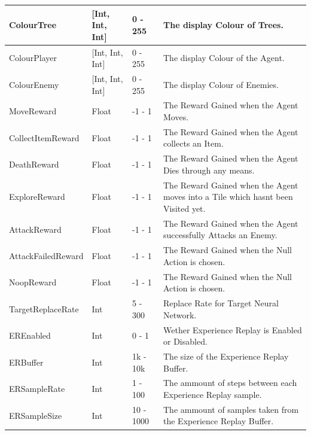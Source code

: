 \begin{flushleft}
\begin{longtable}{| C{4cm} | C{2cm} | C{1.5cm} | C{8cm} |}
                    \hline
                    ColourTree & [Int, Int, Int] & 0 - 255 & The display Colour of Trees. \\
                    \hline
                    ColourPlayer & [Int, Int, Int] & 0 - 255 & The display Colour of the Agent. \\
                    \hline
                    ColourEnemy & [Int, Int, Int] & 0 - 255 & The display Colour of Enemies. \\
                    \hline
                    MoveReward & Float & -1 - 1 & The Reward Gained when the Agent Moves. \\
                    \hline
                    CollectItemReward & Float & -1 - 1 & The Reward Gained when the Agent collects an Item. \\
                    \hline
                    DeathReward & Float & -1 - 1 & The Reward Gained when the Agent Dies through any means. \\
                    \hline
                    ExploreReward & Float & -1 - 1 & The Reward Gained when the Agent moves into a Tile which hasnt been Visited yet. \\
                    \hline
                    AttackReward & Float & -1 - 1 & The Reward Gained when the Agent successfully Attacks an Enemy. \\
                    \hline
                    AttackFailedReward & Float & -1 - 1 & The Reward Gained when the Null Action is chosen. \\
                    \hline
                    NoopReward & Float & -1 - 1 & The Reward Gained when the Null Action is chosen. \\
                    \hline
                    TargetReplaceRate & Int & 5 - 300 & Replace Rate for Target Neural Network. \\
                    \hline
                    EREnabled & Int & 0 - 1 & Wether Experience Replay is Enabled or Disabled. \\
                    \hline
                    ERBuffer & Int & 1k - 10k & The size of the Experience Replay Buffer. \\
                    \hline
                    ERSampleRate & Int & 1 - 100 & The ammount of steps between each Experience Replay sample. \\
                    \hline
                    ERSampleSize & Int & 10 - 1000 & The ammount of samples taken from the Experience Replay Buffer. \\

\end{longtable}
\end{flushleft}
